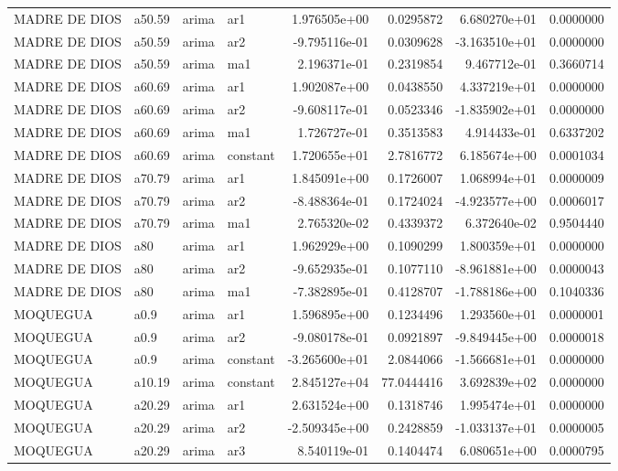 \documentclass[
]{article}
\begin{document}
\begin{table}[!h]
\begin{tabular}[t]{llllrrrr}
MADRE DE DIOS & a50.59 & arima & ar1 & 1.976505e+00 & 0.0295872 & 6.680270e+01 & 0.0000000\\
MADRE DE DIOS & a50.59 & arima & ar2 & -9.795116e-01 & 0.0309628 & -3.163510e+01 & 0.0000000\\
MADRE DE DIOS & a50.59 & arima & ma1 & 2.196371e-01 & 0.2319854 & 9.467712e-01 & 0.3660714\\
\addlinespace
MADRE DE DIOS & a60.69 & arima & ar1 & 1.902087e+00 & 0.0438550 & 4.337219e+01 & 0.0000000\\
MADRE DE DIOS & a60.69 & arima & ar2 & -9.608117e-01 & 0.0523346 & -1.835902e+01 & 0.0000000\\
MADRE DE DIOS & a60.69 & arima & ma1 & 1.726727e-01 & 0.3513583 & 4.914433e-01 & 0.6337202\\
MADRE DE DIOS & a60.69 & arima & constant & 1.720655e+01 & 2.7816772 & 6.185674e+00 & 0.0001034\\
MADRE DE DIOS & a70.79 & arima & ar1 & 1.845091e+00 & 0.1726007 & 1.068994e+01 & 0.0000009\\
\addlinespace
MADRE DE DIOS & a70.79 & arima & ar2 & -8.488364e-01 & 0.1724024 & -4.923577e+00 & 0.0006017\\
MADRE DE DIOS & a70.79 & arima & ma1 & 2.765320e-02 & 0.4339372 & 6.372640e-02 & 0.9504440\\
MADRE DE DIOS & a80 & arima & ar1 & 1.962929e+00 & 0.1090299 & 1.800359e+01 & 0.0000000\\
MADRE DE DIOS & a80 & arima & ar2 & -9.652935e-01 & 0.1077110 & -8.961881e+00 & 0.0000043\\
MADRE DE DIOS & a80 & arima & ma1 & -7.382895e-01 & 0.4128707 & -1.788186e+00 & 0.1040336\\
\addlinespace
MOQUEGUA & a0.9 & arima & ar1 & 1.596895e+00 & 0.1234496 & 1.293560e+01 & 0.0000001\\
MOQUEGUA & a0.9 & arima & ar2 & -9.080178e-01 & 0.0921897 & -9.849445e+00 & 0.0000018\\
MOQUEGUA & a0.9 & arima & constant & -3.265600e+01 & 2.0844066 & -1.566681e+01 & 0.0000000\\
MOQUEGUA & a10.19 & arima & constant & 2.845127e+04 & 77.0444416 & 3.692839e+02 & 0.0000000\\
MOQUEGUA & a20.29 & arima & ar1 & 2.631524e+00 & 0.1318746 & 1.995474e+01 & 0.0000000\\
\addlinespace
MOQUEGUA & a20.29 & arima & ar2 & -2.509345e+00 & 0.2428859 & -1.033137e+01 & 0.0000005\\
MOQUEGUA & a20.29 & arima & ar3 & 8.540119e-01 & 0.1404474 & 6.080651e+00 & 0.0000795\\

\end{tabular}
\end{table}
\end{document}
